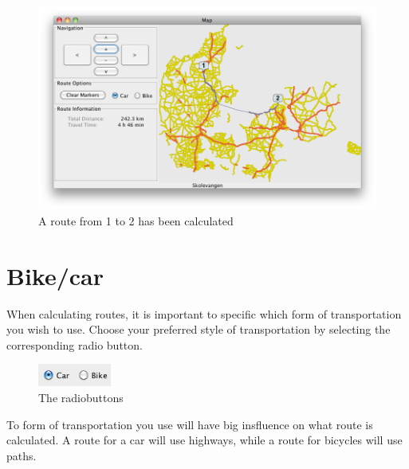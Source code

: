 \begin{figure}[h!]
\centering
\includegraphics[width=1\linewidth]{images/man-route.png}
\caption{A route from 1 to 2 has been calculated}
\label{MAN-RF-IMG}
\end{figure}

\section{Bike/car}
\label{MAN-BC}
When calculating routes, it is important to specific which form of
transportation you wish to use. Choose your preferred style of transportation by
selecting the corresponding radio button.

\begin{figure}[h!]
\centering
\includegraphics[height=2em]{images/radiobuttons.png}
\caption{The radiobuttons}
\label{MAN-BC-IMG}
\end{figure}

To form of transportation you use will have big insfluence on what route is
calculated. A route for a car will use highways, while a route for bicycles will
use paths.

